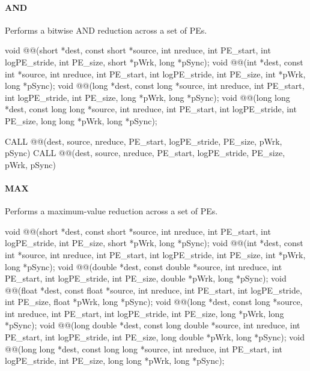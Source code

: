 
\begin{apidefinition}

\paragraph{AND}
Performs a bitwise AND reduction across a set of \acp{PE}.\newline
\begin{Csynopsis}
void @@(short *dest, const short *source, int nreduce, int PE_start, int logPE_stride, int PE_size, short *pWrk, long *pSync);
void @@(int *dest, const int *source, int nreduce, int PE_start, int logPE_stride, int PE_size, int *pWrk, long *pSync);
void @@(long *dest, const long *source, int nreduce, int PE_start, int logPE_stride, int PE_size, long *pWrk, long *pSync);
void @@(long long *dest, const long long *source, int nreduce, int PE_start, int logPE_stride, int PE_size, long long *pWrk, long *pSync);
\end{Csynopsis}

\begin{Fsynopsis}
CALL @@(dest, source, nreduce, PE_start, logPE_stride, PE_size, pWrk, pSync)
CALL @@(dest, source, nreduce, PE_start, logPE_stride, PE_size, pWrk, pSync)
\end{Fsynopsis}

\paragraph{MAX}
Performs a maximum-value reduction across a set of \acp{PE}.\newline
\begin{Csynopsis}
void @@(short *dest, const short *source, int nreduce, int PE_start, int logPE_stride, int PE_size, short *pWrk, long *pSync);
void @@(int *dest, const int *source, int nreduce, int PE_start, int logPE_stride, int PE_size, int *pWrk, long *pSync);
void @@(double *dest, const double *source, int nreduce, int PE_start, int logPE_stride, int PE_size, double *pWrk, long *pSync);
void @@(float *dest, const float *source, int nreduce, int PE_start, int logPE_stride, int PE_size, float *pWrk, long *pSync);
void @@(long *dest, const long *source, int nreduce, int PE_start, int logPE_stride, int PE_size, long *pWrk, long *pSync);
void @@(long double *dest, const long double *source, int nreduce, int PE_start, int logPE_stride, int PE_size, long double *pWrk, long *pSync);
void @@(long long *dest, const long long *source, int nreduce, int PE_start, int logPE_stride, int PE_size, long long *pWrk, long *pSync);
\end{Csynopsis}


\end{apidefinition}
